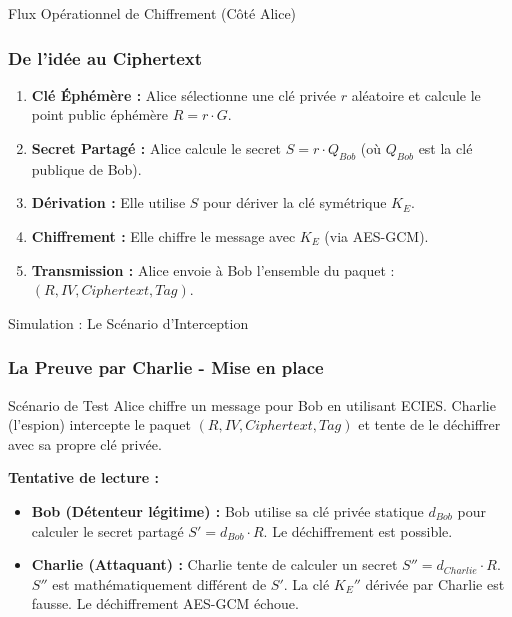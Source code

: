 \begin{frame}{Flux Opérationnel de Chiffrement (Côté Alice)}
\frametitle{De l'idée au Ciphertext}
\centering

\begin{enumerate}
    \item \textbf{Clé Éphémère :} Alice sélectionne une clé privée $r$ aléatoire et calcule le point public éphémère $R = r \cdot G$.
    \item \textbf{Secret Partagé :} Alice calcule le secret $S = r \cdot Q_{Bob}$ (où $Q_{Bob}$ est la clé publique de Bob).
    \item \textbf{Dérivation :} Elle utilise $S$ pour dériver la clé symétrique $K_E$.
    \item \textbf{Chiffrement :} Elle chiffre le message avec $K_E$ (via AES-GCM).
    \item \textbf{Transmission :} Alice envoie à Bob l'ensemble du paquet : $(R, IV, Ciphertext, Tag)$.
\end{enumerate}
\end{frame}

\begin{frame}{Simulation : Le Scénario d'Interception}
\frametitle{La Preuve par Charlie - Mise en place}

\begin{block}{Scénario de Test}
    Alice chiffre un message pour Bob en utilisant ECIES. Charlie (l'espion) intercepte le paquet $(R, IV, Ciphertext, Tag)$ et tente de le déchiffrer avec sa propre clé privée.
\end{block}

\textbf{Tentative de lecture :}
\begin{itemize}
    \item \textbf{Bob (Détenteur légitime) :} Bob utilise sa clé privée statique $d_{Bob}$ pour calculer le secret partagé $S' = d_{Bob} \cdot R$. Le déchiffrement est possible.
    \item \textbf{Charlie (Attaquant) :} Charlie tente de calculer un secret $S'' = d_{Charlie} \cdot R$. $S''$ est mathématiquement différent de $S'$.  La clé $K_E''$ dérivée par Charlie est fausse. Le déchiffrement AES-GCM échoue.
\end{itemize}
\end{frame}



